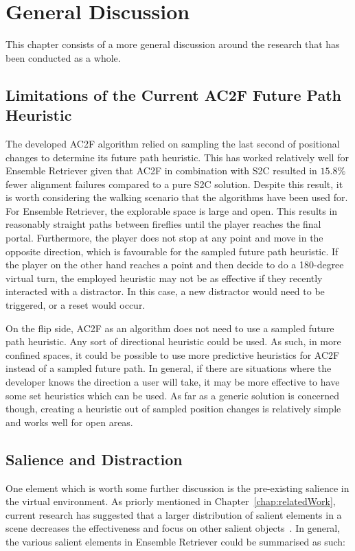 \chapter{General Discussion}\label{chap:discussion}
This chapter consists of a more general discussion around the research that has been conducted as a whole. 

\section{Limitations of the Current AC2F Future Path Heuristic}
The developed AC2F algorithm relied on sampling the last second of positional changes to determine its future path heuristic. This has worked relatively well for Ensemble Retriever given that AC2F in combination with S2C resulted in $15.8\%$ fewer alignment failures compared to a pure S2C solution. Despite this result, it is worth considering the walking scenario that the algorithms have been used for. For Ensemble Retriever, the explorable space is large and open. This results in reasonably straight paths between fireflies until the player reaches the final portal. Furthermore, the player does not stop at any point and move in the opposite direction, which is favourable for the sampled future path heuristic. If the player on the other hand reaches a point and then decide to do a 180-degree virtual turn, the employed heuristic may not be as effective if they recently interacted with a distractor. In this case, a new distractor would need to be triggered, or a reset would occur. 

On the flip side, AC2F as an algorithm does not need to use a sampled future path heuristic. Any sort of directional heuristic could be used. As such, in more confined spaces, it could be possible to use more predictive heuristics for AC2F instead of a sampled future path. In general, if there are situations where the developer knows the direction a user will take, it may be more effective to have some set heuristics which can be used. As far as a generic solution is concerned though, creating a heuristic out of sampled position changes is relatively simple and works well for open areas. 
   
\section{Salience and Distraction}
One element which is worth some further discussion is the pre-existing salience in the virtual environment. As priorly mentioned in Chapter~\ref{chap:relatedWork}, current research has suggested that a larger distribution of salient elements in a scene decreases the effectiveness and focus on other salient objects~\cite{sitzmann2018saliency}. In general, the various salient elements in Ensemble Retriever could be summarised as such:

